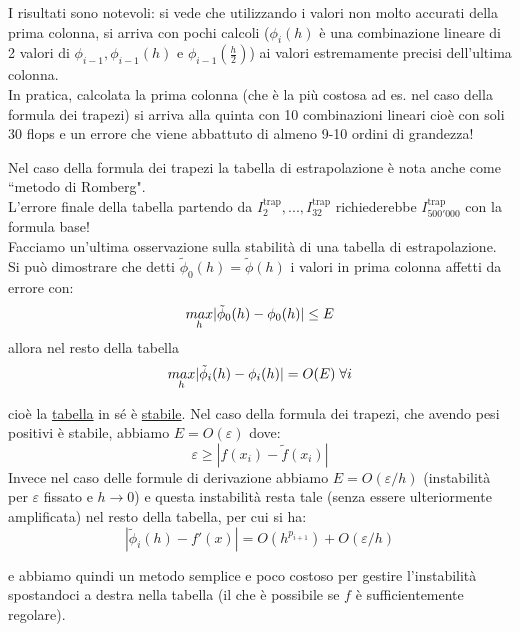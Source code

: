 \documentclass[12pt,a4paper]{article}
\DeclarePairedDelimiter{\abs}{\lvert}{\rvert}
\begin{document}
I risultati sono notevoli: si vede che utilizzando i valori non molto accurati della prima colonna, si arriva con pochi calcoli ($\phi_i(h)$ è una combinazione lineare di 2 valori di $\phi_{i-1},\phi_{i-1}(h)$ e $\phi_{i-1}(\frac{h}{2})$) ai valori estremamente precisi dell'ultima colonna.\\In pratica, calcolata la prima colonna (che è la più costosa ad es. nel caso della formula dei trapezi) si arriva alla quinta con 10 combinazioni lineari cioè con soli 30 flops e un errore che viene abbattuto di almeno 9-10 ordini di grandezza!

Nel caso della formula dei trapezi la tabella di estrapolazione è nota anche come ``metodo di Romberg".\\
L'errore finale della tabella partendo da $I_2^{\text{trap}},...,I_{32}^{\text{trap}}$ richiederebbe $I_{500'000}^{\text{trap}}$ con la formula base!\\
Facciamo un'ultima osservazione sulla stabilità di una tabella di estrapolazione.\\
Si può dimostrare che detti $\tilde{\phi}_0(h)=\tilde{\phi}(h)$ i valori in prima colonna affetti da errore con:
\begin{equation*}
    \underset{h}{max} \abs{\tilde{\phi}_0(h)-\phi_0(h)} \leq E
\end{equation*}
allora nel resto della tabella 
\begin{equation*}
    \underset{h}{max} \abs{\tilde{\phi}_i(h)-\phi_i(h)} = O(E) \; \forall i 
\end{equation*}

cioè la \uline{tabella} in sé è \uline{stabile}.
Nel caso della formula dei trapezi, che avendo pesi positivi è stabile, abbiamo $E=O(\varepsilon)$ dove:
\begin{equation*}
    \varepsilon \geq |f(x_i)-\tilde{f}(x_i)|
\end{equation*}
Invece nel caso delle formule di derivazione abbiamo $E=O(\varepsilon/h)$ (instabilità per $\varepsilon$ fissato e $h\rightarrow 0$) e questa instabilità resta tale (senza essere ulteriormente amplificata) nel resto della tabella, per cui si ha:
\begin{equation*}
    |\tilde{\phi}_i(h)-f'(x)|=O(h^{p_{i+1}})+O(\varepsilon/h)
\end{equation*}

e abbiamo quindi un metodo semplice e poco costoso per gestire l'instabilità spostandoci a destra nella tabella (il che è possibile se $f$ è sufficientemente regolare).
\end{document}
